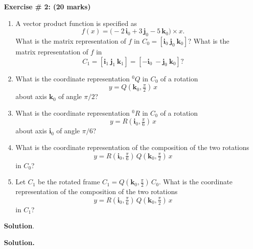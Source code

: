 \documentclass[11pt]{article}
\begin{document}
\vspace{10pt}
\noindent \textbf{Exercise \# 2: (20 marks)}
\begin{enumerate}[label=(\roman*)]
\item A vector product function is specified as
\[
f(x) = \bigl(-2\,\mathbf{i}_0 + 3\,\mathbf{j}_0 - 5\,\mathbf{k}_0\bigr)\times x.
\]
What is the matrix representation of $f$ in $C_0 = [\mathbf{i}_0\ \mathbf{j}_0\ \mathbf{k}_0]$?
What is the matrix representation of $f$ in
\[
C_1 = [\mathbf{i}_1\ \mathbf{j}_1\ \mathbf{k}_1] = [-\mathbf{i}_0\ -\mathbf{j}_0\ \mathbf{k}_0]?
\]

\item What is the coordinate representation ${}^{0}\!Q$ in $C_0$ of a rotation
\[
y = Q(\mathbf{k}_0,\tfrac{\pi}{2})\,x
\]
about axis $\mathbf{k}_0$ of angle $\pi/2$?

\item What is the coordinate representation ${}^{0}\!R$ in $C_0$ of a rotation
\[
y = R(\mathbf{i}_0,\tfrac{\pi}{6})\,x
\]
about axis $\mathbf{i}_0$ of angle $\pi/6$?

\item What is the coordinate representation of the composition of the two rotations
\[
y = R(\mathbf{i}_0,\tfrac{\pi}{6})\,Q(\mathbf{k}_0,\tfrac{\pi}{2})\,x
\]
in $C_0$?

\item Let $C_1$ be the rotated frame $C_1 = Q(\mathbf{k}_0,\tfrac{\pi}{2})\,C_0$.
What is the coordinate representation of the composition of the two rotations
\[
y = R(\mathbf{i}_0,\tfrac{\pi}{6})\,Q(\mathbf{k}_0,\tfrac{\pi}{2})\,x
\]
in $C_1$?
\end{enumerate}

\textbf{Solution}.

\noindent\textbf{Solution.}
\end{document}
